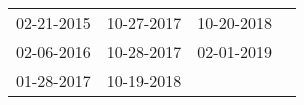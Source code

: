 \begin{supertabular}{llll}
 02-21-2015 &  10-27-2017 &  10-20-2018 \\
 02-06-2016 &  10-28-2017 &  02-01-2019 \\
 01-28-2017 &  10-19-2018 &             \\
\end{supertabular}
